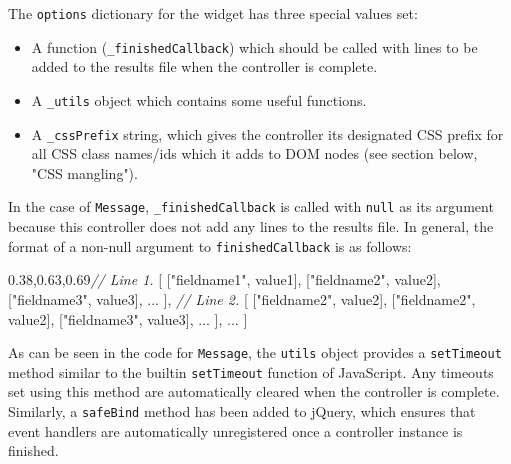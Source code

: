 \documentclass[
]{article}
\newenvironment{Shaded}{}{}
\newcommand{\CommentTok}[1]{\textcolor[rgb]{0.38,0.63,0.69}{\textit{#1}}}
\newcommand{\NormalTok}[1]{#1}
\newcommand{\OperatorTok}[1]{\textcolor[rgb]{0.40,0.40,0.40}{#1}}
\newcommand{\StringTok}[1]{\textcolor[rgb]{0.25,0.44,0.63}{#1}}
\providecommand{\tightlist}{%
  \setlength{\itemsep}{0pt}\setlength{\parskip}{0pt}}
\begin{document}
The \texttt{options} dictionary for the widget has three special values
set:

\begin{itemize}
\tightlist
\item
  A function (\texttt{\_finishedCallback}) which should be called with
  lines to be added to the results file when the controller is complete.
\item
  A \texttt{\_utils} object which contains some useful functions.
\item
  A \texttt{\_cssPrefix} string, which gives the controller its
  designated CSS prefix for all CSS class names/ids which it adds to DOM
  nodes (see section below, "CSS mangling").
\end{itemize}

In the case of \texttt{Message}, \texttt{\_finishedCallback} is called
with \texttt{null} as its argument because this controller does not add
any lines to the results file. In general, the format of a non-null
argument to \texttt{finishedCallback} is as follows:

\begin{Shaded}
\begin{Highlighting}[]
\NormalTok{    [}
        \CommentTok{// Line 1.}
\NormalTok{        [ [}\StringTok{"fieldname1"}\OperatorTok{,}\NormalTok{ value1]}\OperatorTok{,}\NormalTok{ [}\StringTok{"fieldname2"}\OperatorTok{,}\NormalTok{ value2]}\OperatorTok{,}\NormalTok{ [}\StringTok{"fieldname3"}\OperatorTok{,}\NormalTok{ value3]}\OperatorTok{,} \OperatorTok{...}\NormalTok{ ]}\OperatorTok{,}
        \CommentTok{// Line 2.}
\NormalTok{        [ [}\StringTok{"fieldname2"}\OperatorTok{,}\NormalTok{ value2]}\OperatorTok{,}\NormalTok{ [}\StringTok{"fieldname2"}\OperatorTok{,}\NormalTok{ value2]}\OperatorTok{,}\NormalTok{ [}\StringTok{"fieldname3"}\OperatorTok{,}\NormalTok{ value3]}\OperatorTok{,} \OperatorTok{...}\NormalTok{ ]}\OperatorTok{,}
        \OperatorTok{...}
\NormalTok{    ]}
\end{Highlighting}
\end{Shaded}

As can be seen in the code for \texttt{Message}, the \texttt{utils}
object provides a \texttt{setTimeout} method similar to the builtin
\texttt{setTimeout} function of JavaScript. Any timeouts set using this
method are automatically cleared when the controller is complete.
Similarly, a \texttt{safeBind} method has been added to jQuery, which
ensures that event handlers are automatically unregistered once a
controller instance is finished.
\end{document}
